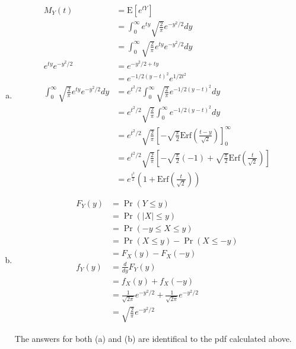 \documentclass[11pt]{article}
\begin{document}
\begin{enumerate}[(a)]
    \item 

      \begin{align*}
        M_Y(t) &= \mathrm{E} \left[ e^{tY} \right] \\
        &= \int_0^{\infty} e^{ty} \sqrt{\frac{2}{\pi}} e^{-y^2/2} dy \\
        &= \int_0^{\infty} \sqrt{\frac{2}{\pi}} e^{ty} e^{-y^2/2} dy \\
        e^{ty} e^{-y^2/2} &= e^{-y^2/2 + ty} \\
        &= e^{-1/2(y-t)^2} e^{1/2 t^2} \\
        \int_0^{\infty} \sqrt{\frac{2}{\pi}} e^{ty} e^{-y^2/2} dy &= e^{t^2/2} \int_0^{\infty} \sqrt{\frac{2}{\pi}} e^{-1/2(y-t)^2} dy \\
        &= e^{t^2/2} \sqrt{\frac{2}{\pi}} \int_0^{\infty} e^{-1/2(y-t)^2} dy \\
        &= e^{t^2/2} \sqrt{\frac{2}{\pi}} \left[ -\sqrt{\frac{\pi}{2}} \mathrm{Erf} \left( \frac{t-y}{\sqrt{2}} \right) \right]_0^{\infty} \\
        &= e^{t^2/2} \sqrt{\frac{2}{\pi}} \left[ -\sqrt{\frac{\pi}{2}} \left( -1 \right) + \sqrt{\frac{\pi}{2}} \mathrm{Erf} \left( \frac{t}{\sqrt{2}} \right) \right] \\
        &= e^{\frac{t^2}{2}} \left(1 + \mathrm{Erf}\left( \frac{t}{\sqrt{2}} \right) \right)
      \end{align*}

    \item 
      \begin{align*}
        F_Y(y) &= \Pr(Y \le y) \\
        &= \Pr(|X| \le y) \\
        &= \Pr(-y \le X \le y) \\
        &= \Pr(X \le y) - \Pr(X \le -y) \\
        &= F_X(y) - F_X(-y) \\
        f_Y(y) &= \frac{d}{dy} F_Y(y) \\
        &= f_X(y) + f_X(-y) \\
        &= \frac{1}{\sqrt{2 \pi}} e^{-y^2/2} + \frac{1}{\sqrt{2 \pi}} e^{-y^2/2} \\
        &= \sqrt{\frac{2}{\pi}} e^{-y^2/2}
      \end{align*}

      The answers for both (a) and (b) are identifical to the pdf calculated above.

\end{enumerate}
\end{document}
